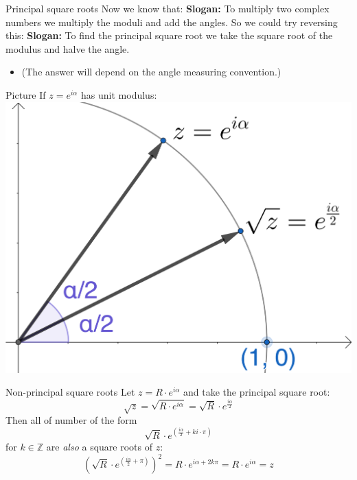 \documentclass{beamer}
\begin{document}
\begin{frame}{Principal square roots}
Now we know that:\vfill
{\bf Slogan:} To multiply two complex numbers we multiply the moduli and add the angles.\vfill
So we could try reversing this:\vfill
{\bf Slogan:} To find the principal square root we take the square root of the modulus and halve the angle.\vfill
\begin{itemize}
	\item (The answer will depend on the angle measuring convention.)
\end{itemize}
\end{frame}

\begin{frame}{Picture}
If $z = e^{i\alpha}$ has unit modulus:\vfill
\includegraphics[scale=5]{principal-square-root.png}
\end{frame}

\begin{frame}{Non-principal square roots}
Let $z = R\cdot e^{i\alpha}$ and take the principal square root:\vfill
{\LARGE
\begin{equation*}
\sqrt{z} = \sqrt{R\cdot e^{i\alpha}} = \sqrt{R}\cdot e^{\frac{i\alpha}{2}}
\end{equation*}
}\vfill
Then all of number of the form\vfill
{\LARGE
\begin{equation*}
\sqrt{R}\cdot e^{(\frac{i\alpha}{2}+ki\cdot\pi)}
\end{equation*}
}\vfill
for $k\in \mathbb{Z}$ are \emph{also} a square roots of $z$:\vfill
{\LARGE
\begin{equation*}
\left(\sqrt{R}\cdot e^{(\frac{i\alpha}{2}+\pi)}\right)^2 = R\cdot e^{i\alpha + 2k\pi} = R\cdot e^{i\alpha} = z
\end{equation*}
}
\end{frame}
\end{document}
